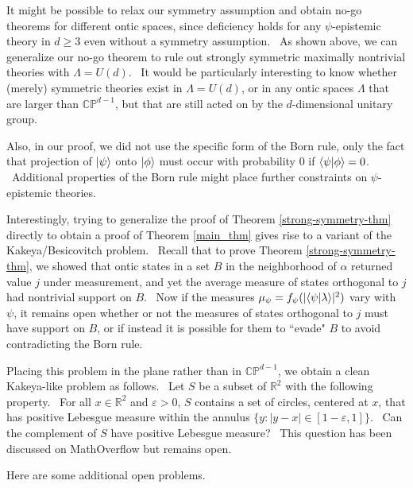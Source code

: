 \documentclass[letterpaper,11pt]{article}
\newcommand{\braket}[2]{\mbox{$ \langle #1 | #2 \rangle $}}
\newcommand{\ket}[1]{\mbox{$ | #1 \rangle $}}
\begin{document}
It might be possible to relax our symmetry assumption and obtain no-go theorems for different ontic spaces,
since deficiency holds for any $\psi$-epistemic theory in $d\geq 3$ even
without a symmetry assumption. \ As shown above, we can generalize our no-go theorem to rule out strongly symmetric maximally nontrivial theories with $\Lambda=U(d)$. \ It would be particularly interesting to know whether (merely) symmetric theories exist in $\Lambda=U(d)$, or in any ontic spaces $\Lambda$ that are larger than $\mathbb{CP}^{d-1}$, but that are still acted on by the $d$-dimensional unitary group.

Also, in our proof, we did not use the
specific form of the Born rule, only the fact that projection of $\ket{\psi}$ onto $\ket{\phi}$ must occur with
probability $0$ if $\braket{\psi}{\phi}=0$. \ Additional properties of the Born rule might place further constraints on
$\psi$-epistemic theories.

Interestingly, trying to generalize the proof of Theorem \ref{strong-symmetry-thm} directly to obtain a proof of Theorem \ref{main_thm} gives rise to a  variant of the Kakeya/Besicovitch problem. \ Recall that to prove Theorem \ref{strong-symmetry-thm}, we showed that ontic states in a set $B$ in the neighborhood of $\alpha$ returned value $j$ under measurement, and yet the average measure of states orthogonal to $j$ had nontrivial support on $B$. \ Now if the measures $\mu_\psi = f_\psi (|\braket{\psi}{\lambda}|^2)$ vary with $\psi$, it remains open whether or not the measures of states orthogonal to $j$ must have support on $B$, or if instead it is possible for them to ``evade" $B$ to avoid contradicting the Born rule.

Placing this problem in the plane rather than in $\mathbb{CP}^{d-1}$, we obtain a clean Kakeya-like problem as follows. \ Let $S$ be a subset of $\mathbb{R}^2$ with the following property. \ For all $x \in \mathbb{R}^2$ and $\varepsilon > 0$,  $S$ contains a set of circles, centered at $x$, that has positive Lebesgue measure within the annulus $ \{ y : | y-x | \in [1-\varepsilon,1] \}$. \ Can the complement of $S$ have positive Lebesgue measure? \ This question has been discussed on MathOverflow \cite{mathoverflow2} but remains open.

Here are some additional open problems.
\end{document}
